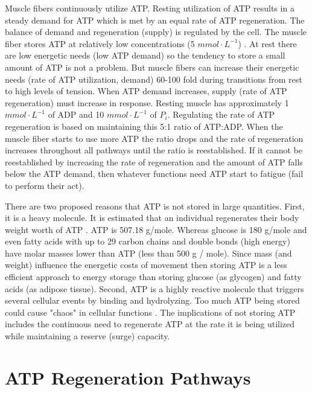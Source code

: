 Muscle fibers continuously utilize ATP. Resting utilization of ATP results in a steady demand for ATP which is met by an equal rate of ATP regeneration. The balance of demand and regeneration (supply) is regulated by the cell. The muscle fiber stores ATP at relatively low concentrations (5 $mmol \cdot L^{-1}$) \cite{feher_quantitative_2017, jones_skeletal_2006}. At rest there are low energetic needs (low ATP demand) so the tendency to store a small amount of ATP is not a problem. But muscle fibers can increase their energetic needs (rate of ATP utilization, demand) 60-100 fold during transitions from rest to high levels of tension. When ATP demand increases, supply (rate of ATP regeneration) must increase in response. Resting muscle has approximately 1 $mmol \cdot L^{-1}$ of ADP and 10 $mmol \cdot L^{-1}$ of $P_i$. Regulating the rate of ATP regeneration is based on maintaining this 5:1 ratio of ATP:ADP. When the muscle fiber starts to use more ATP the ratio drops and the rate of regeneration increases throughout all pathways until the ratio is reestablished. If it cannot be reestablished by increasing the rate of regeneration and the amount of ATP falls below the ATP demand, then whatever functions need ATP start to fatigue (fail to perform their act). 

There are two proposed reasons that ATP is not stored in large quantities. First, it is a heavy molecule. It is estimated that an individual regenerates their body weight worth of ATP \cite{tornroth-horsefield_opening_2008}. ATP is 507.18 g/mole. Whereas glucose is 180 g/mole and even fatty acids with up to 29 carbon chains and double bonds (high energy) have molar masses lower than ATP (less than 500 g / mole). Since mass (and weight) influence the energetic costs of movement then storing ATP is a less efficient approach to energy storage than storing glucose (as glycogen) and fatty acids (as adipose tissue). Second, ATP is a highly reactive molecule that triggers several cellular events by binding and hydrolyzing. Too much ATP being stored could cause "chaos" in cellular functions \cite{jones_skeletal_2006}. The implications of not storing ATP includes the continuous need to regenerate ATP at the rate it is being utilized while maintaining a reserve (surge) capacity.



\section{ATP Regeneration Pathways}

